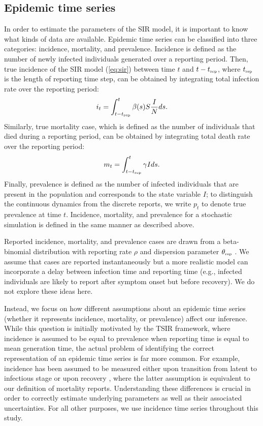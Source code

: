 \documentclass{article}
\newcommand{\eref}[1]{(\ref{eq:#1})}
\newcommand{\tsub}[2]{#1_{{\textrm{\tiny #2}}}}
\begin{document}
\subsection{Epidemic time series}

In order to estimate the parameters of the SIR model, it is important to know what kinds of data are available.
Epidemic time series can be classified into three categories: incidence, mortality, and prevalence.
Incidence is defined as the number of newly infected individuals generated over a reporting period.
Then, true incidence of the SIR model \eref{sir} between time $t$ and $t-\tsub{t}{rep}$, where $\tsub{t}{rep}$ is the length of reporting time step, can be obtained by integrating total infection rate over the reporting period:
\begin{equation}
i_t = \int_{t-\tsub{t}{rep}}^{t} \beta(s) S \frac{I}{N} ds.
\end{equation}
Similarly, true mortality case, which is defined as the number of individuals that died during a reporting period, can be obtained by integrating total death rate  over the reporting period:
\begin{equation}
m_t = \int_{t-\tsub{t}{rep}}^{t} \gamma I ds.
\end{equation}
Finally, prevalence is defined as the number of infected individuals that are present in the population and corresponds to the state variable $I$; to distinguish the continuous dynamics from the discrete reports, we write $p_t$ to denote true prevalence at time $t$.
Incidence, mortality, and prevalence for a stochastic simulation is defined in the same manner as described above.

Reported incidence, mortality, and prevalence cases are drawn from a beta-binomial distribution with reporting rate $\rho$ and dispersion parameter $\tsub{\theta}{rep}$ \citep{morris1997disentangling}.
We assume that cases are reported instantaneously but a more realistic model can incorporate a delay between infection time and reporting time (e.g., infected individuals are likely to report after symptom onset but before recovery).
We do not explore these ideas here.

Instead, we focus on how different assumptions about an epidemic time series (whether it represents incidence, mortality, or prevalence) affect our inference.
While this question is initially motivated by the TSIR framework, where incidence is assumed to be equal to prevalence when reporting time is equal to mean generation time, the actual problem of identifying the correct representation of an epidemic time series is far more common.
For example, incidence has been assumed to be measured either upon transition from latent to infectious stage \citep{hooker2010parameterizing, althaus2014estimating} or upon recovery \citep{he2009plug}, where the latter assumption is equivalent to our definition of mortality reports.
Understanding these differences is crucial in order to correctly estimate underlying parameters as well as their associated uncertainties.
For all other purposes, we use incidence time series throughout this study.
\end{document}
